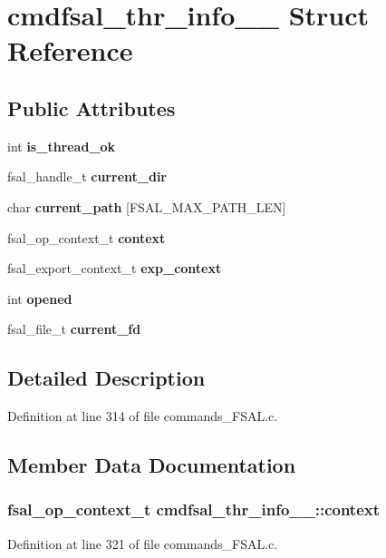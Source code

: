 \section{cmdfsal\_\-thr\_\-info\_\-\_\- Struct Reference}
\label{structcmdfsal__thr__info____}
\subsection*{Public Attributes}
\begin{CompactItemize}
\item 
int {\bf is\_\-thread\_\-ok}
\item 
fsal\_\-handle\_\-t {\bf current\_\-dir}
\item 
char {\bf current\_\-path} [FSAL\_\-MAX\_\-PATH\_\-LEN]
\item 
fsal\_\-op\_\-context\_\-t {\bf context}
\item 
fsal\_\-export\_\-context\_\-t {\bf exp\_\-context}
\item 
int {\bf opened}
\item 
fsal\_\-file\_\-t {\bf current\_\-fd}
\end{CompactItemize}


\subsection{Detailed Description}


Definition at line 314 of file commands\_\-FSAL.c.

\subsection{Member Data Documentation}
\subsubsection[{context}]{\setlength{\rightskip}{0pt plus 5cm}fsal\_\-op\_\-context\_\-t {\bf cmdfsal\_\-thr\_\-info\_\-\_\-::context}}\label{structcmdfsal__thr__info_____aeb91047301b0b9b18a8965dd1785f69}




Definition at line 321 of file commands\_\-FSAL.c.
